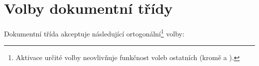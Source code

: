 
\chapter{Volby dokumentní třídy}\label{options}%

Dokumentní třída  akceptuje následující ortogonální\footnote{Aktivace určité
  volby neovlivňuje funkčnost voleb ostatních (kromě  a
  ).} volby:

